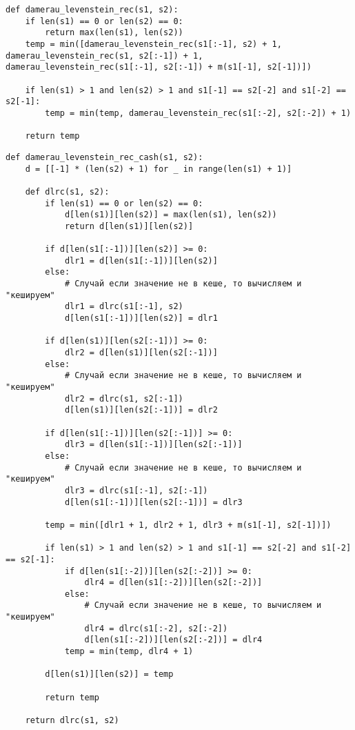 \clearpage

\begin{lstlisting}[label=lst:dameray_lev_mtr,caption=Функция нахождения расстояния Дамерау-Левенштейна рекурсивно]
def damerau_levenstein_rec(s1, s2):
	if len(s1) == 0 or len(s2) == 0:
		return max(len(s1), len(s2))
	temp = min([damerau_levenstein_rec(s1[:-1], s2) + 1, damerau_levenstein_rec(s1, s2[:-1]) + 1, damerau_levenstein_rec(s1[:-1], s2[:-1]) + m(s1[-1], s2[-1])])

	if len(s1) > 1 and len(s2) > 1 and s1[-1] == s2[-2] and s1[-2] == s2[-1]:
		temp = min(temp, damerau_levenstein_rec(s1[:-2], s2[:-2]) + 1)

	return temp
\end{lstlisting}

\clearpage

\begin{lstlisting}[label=lst:dameray_lev_rec_hash,caption=Функция нахождения расстояния Дамерау-Левенштейна рекурсивно c кешированием]
def damerau_levenstein_rec_cash(s1, s2):
	d = [[-1] * (len(s2) + 1) for _ in range(len(s1) + 1)]

	def dlrc(s1, s2):
		if len(s1) == 0 or len(s2) == 0:
			d[len(s1)][len(s2)] = max(len(s1), len(s2))
			return d[len(s1)][len(s2)]

		if d[len(s1[:-1])][len(s2)] >= 0:
			dlr1 = d[len(s1[:-1])][len(s2)]
		else:
			# Случай если значение не в кеше, то вычисляем и "кешируем"
			dlr1 = dlrc(s1[:-1], s2)
			d[len(s1[:-1])][len(s2)] = dlr1

		if d[len(s1)][len(s2[:-1])] >= 0:
			dlr2 = d[len(s1)][len(s2[:-1])]
		else:
			# Случай если значение не в кеше, то вычисляем и "кешируем"
			dlr2 = dlrc(s1, s2[:-1])
			d[len(s1)][len(s2[:-1])] = dlr2

		if d[len(s1[:-1])][len(s2[:-1])] >= 0:
			dlr3 = d[len(s1[:-1])][len(s2[:-1])]
		else:
			# Случай если значение не в кеше, то вычисляем и "кешируем"
			dlr3 = dlrc(s1[:-1], s2[:-1])
			d[len(s1[:-1])][len(s2[:-1])] = dlr3

		temp = min([dlr1 + 1, dlr2 + 1, dlr3 + m(s1[-1], s2[-1])])

		if len(s1) > 1 and len(s2) > 1 and s1[-1] == s2[-2] and s1[-2] == s2[-1]:
			if d[len(s1[:-2])][len(s2[:-2])] >= 0:
				dlr4 = d[len(s1[:-2])][len(s2[:-2])]
			else:
				# Случай если значение не в кеше, то вычисляем и "кешируем"
				dlr4 = dlrc(s1[:-2], s2[:-2])
				d[len(s1[:-2])][len(s2[:-2])] = dlr4
			temp = min(temp, dlr4 + 1)

		d[len(s1)][len(s2)] = temp

		return temp

	return dlrc(s1, s2)
\end{lstlisting}

